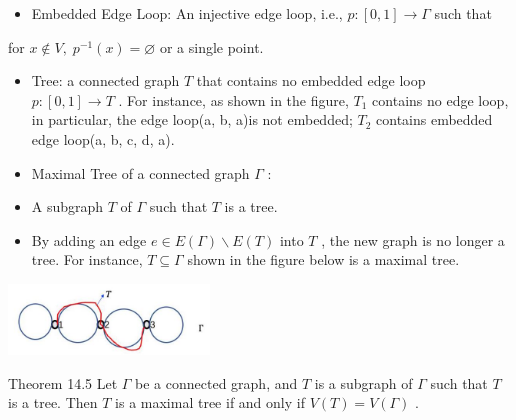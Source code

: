 \begin{itemize}
\item Embedded Edge Loop: An injective edge loop, i.e., \(p : \left\lbrack  {0,1}\right\rbrack   \rightarrow  \Gamma\) such that
\end{itemize}

for \(x \notin  V,\;{p}^{-1}\left( x\right)  = \varnothing\) or a single point.

\begin{itemize}
\item Tree: a connected graph \(T\) that contains no embedded edge loop \(p : \left\lbrack  {0,1}\right\rbrack   \rightarrow  T\) . For instance, as shown in the figure, \({T}_{1}\) contains no edge loop, in particular, the edge loop(a, b, a)is not embedded; \({T}_{2}\) contains embedded edge loop(a, b, c, d, a).
\end{itemize}

\begin{itemize}
\item Maximal Tree of a connected graph \(\Gamma\) :
\end{itemize}

\begin{itemize}
\item A subgraph \(T\) of \(\Gamma\) such that \(T\) is a tree.
\end{itemize}

\begin{itemize}
\item By adding an edge \(e \in  E\left( \Gamma \right)  \smallsetminus  E\left( T\right)\) into \(T\) , the new graph is no longer a tree. For instance, \(T \subseteq  \Gamma\) shown in the figure below is a maximal tree.
\end{itemize}

\begin{center}
\includegraphics[max width=0.4\textwidth]{images/bo_d2bcsrref24c73avs720_145_580_1689_526_186_0.jpg}
\end{center}
\hspace*{3em} 

Theorem 14.5 Let \(\Gamma\) be a connected graph, and \(T\) is a subgraph of \(\Gamma\) such that \(T\) is a tree. Then \(T\) is a maximal tree if and only if \(V\left( T\right)  = V\left( \Gamma \right)\) .

